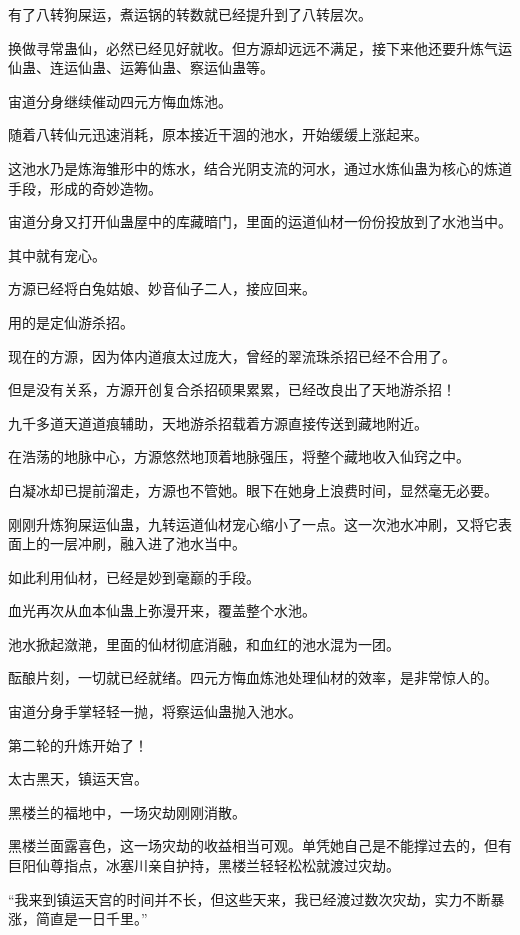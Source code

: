 \begin{this_body}
有了八转狗屎运，煮运锅的转数就已经提升到了八转层次。

换做寻常蛊仙，必然已经见好就收。但方源却远远不满足，接下来他还要升炼气运仙蛊、连运仙蛊、运筹仙蛊、察运仙蛊等。

宙道分身继续催动四元方悔血炼池。

随着八转仙元迅速消耗，原本接近干涸的池水，开始缓缓上涨起来。

这池水乃是炼海雏形中的炼水，结合光阴支流的河水，通过水炼仙蛊为核心的炼道手段，形成的奇妙造物。

宙道分身又打开仙蛊屋中的库藏暗门，里面的运道仙材一份份投放到了水池当中。

其中就有宠心。

方源已经将白兔姑娘、妙音仙子二人，接应回来。

用的是定仙游杀招。

现在的方源，因为体内道痕太过庞大，曾经的翠流珠杀招已经不合用了。

但是没有关系，方源开创复合杀招硕果累累，已经改良出了天地游杀招！

九千多道天道道痕辅助，天地游杀招载着方源直接传送到藏地附近。

在浩荡的地脉中心，方源悠然地顶着地脉强压，将整个藏地收入仙窍之中。

白凝冰却已提前溜走，方源也不管她。眼下在她身上浪费时间，显然毫无必要。

刚刚升炼狗屎运仙蛊，九转运道仙材宠心缩小了一点。这一次池水冲刷，又将它表面上的一层冲刷，融入进了池水当中。

如此利用仙材，已经是妙到毫巅的手段。

血光再次从血本仙蛊上弥漫开来，覆盖整个水池。

池水掀起潋滟，里面的仙材彻底消融，和血红的池水混为一团。

酝酿片刻，一切就已经就绪。四元方悔血炼池处理仙材的效率，是非常惊人的。

宙道分身手掌轻轻一抛，将察运仙蛊抛入池水。

第二轮的升炼开始了！

太古黑天，镇运天宫。

黑楼兰的福地中，一场灾劫刚刚消散。

黑楼兰面露喜色，这一场灾劫的收益相当可观。单凭她自己是不能撑过去的，但有巨阳仙尊指点，冰塞川亲自护持，黑楼兰轻轻松松就渡过灾劫。

“我来到镇运天宫的时间并不长，但这些天来，我已经渡过数次灾劫，实力不断暴涨，简直是一日千里。”


\end{this_body}
